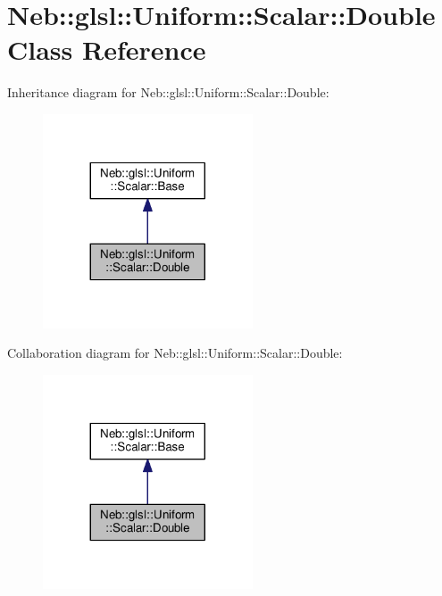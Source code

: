 \hypertarget{classNeb_1_1glsl_1_1Uniform_1_1Scalar_1_1Double}{\section{Neb\-:\-:glsl\-:\-:Uniform\-:\-:Scalar\-:\-:Double Class Reference}
\label{classNeb_1_1glsl_1_1Uniform_1_1Scalar_1_1Double}
}


Inheritance diagram for Neb\-:\-:glsl\-:\-:Uniform\-:\-:Scalar\-:\-:Double\-:
\nopagebreak
\begin{figure}[H]
\begin{center}
\leavevmode
\includegraphics[width=176pt]{classNeb_1_1glsl_1_1Uniform_1_1Scalar_1_1Double__inherit__graph}
\end{center}
\end{figure}


Collaboration diagram for Neb\-:\-:glsl\-:\-:Uniform\-:\-:Scalar\-:\-:Double\-:
\nopagebreak
\begin{figure}[H]
\begin{center}
\leavevmode
\includegraphics[width=176pt]{classNeb_1_1glsl_1_1Uniform_1_1Scalar_1_1Double__coll__graph}
\end{center}
\end{figure}
